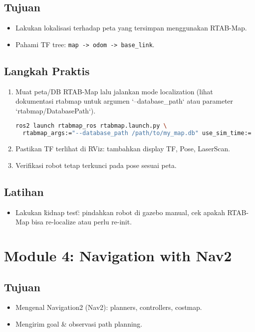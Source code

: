 \documentclass[12pt,a4paper]{article}
\begin{document}
\subsection*{Tujuan}
\begin{itemize}
    \item Lakukan lokalisasi terhadap peta yang tersimpan menggunakan RTAB-Map.
    \item Pahami TF tree: \texttt{map -> odom -> base_link}.
\end{itemize}

\subsection*{Langkah Praktis}
\begin{enumerate}
    \item Muat peta/DB RTAB-Map lalu jalankan mode localization (lihat dokumentasi rtabmap untuk argumen `--database_path` atau parameter `rtabmap/DatabasePath`).
          \begin{lstlisting}[language=bash]
ros2 launch rtabmap_ros rtabmap.launch.py \
  rtabmap_args:="--database_path /path/to/my_map.db" use_sim_time:=true
\end{lstlisting}
    \item Pastikan TF terlihat di RViz: tambahkan display TF, Pose, LaserScan.
    \item Verifikasi robot tetap terkunci pada pose sesuai peta.
\end{enumerate}

\subsection*{Latihan}
\begin{itemize}
    \item Lakukan \"kidnap test\": pindahkan robot di gazebo manual, cek apakah RTAB-Map bisa re-localize atau perlu re-init.
\end{itemize}

\newpage
\section{Module 4: Navigation with Nav2}
\subsection*{Tujuan}
\begin{itemize}
    \item Mengenal Navigation2 (Nav2): planners, controllers, costmap.
    \item Mengirim goal & observasi path planning.
\end{itemize}
\end{document}

